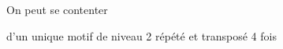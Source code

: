 \documentclass[preview]{standalone}
\begin{document}
\begin{center}
On peut se contenter 
    
  d'un unique motif de niveau 2 répété et transposé 4 fois
\end{center}
\end{document}
